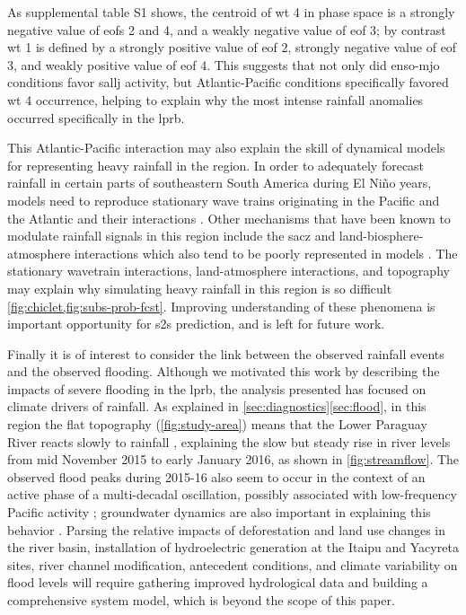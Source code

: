 \documentclass{ametsoc}
\begin{document}
As supplemental table S1 shows, the centroid of \gls{wt} 4 in phase space is a strongly negative value of \glspl{eof} 2 and 4, and a weakly negative value of \gls{eof} 3; by contrast \gls{wt} 1 is defined by a strongly positive value of \gls{eof} 2, strongly negative value of \gls{eof} 3, and weakly positive value of \gls{eof} 4.
This suggests that not only did \gls{enso}-\gls{mjo} conditions favor \gls{sallj} activity, but Atlantic-Pacific conditions specifically favored  \gls{wt} 4 occurrence, helping to explain why the most intense rainfall anomalies occurred specifically in the \gls{lprb}.

This Atlantic-Pacific interaction may also explain the skill of dynamical models for representing heavy rainfall in the region.
In order to adequately forecast rainfall in certain parts of southeastern South America during El Ni\~no years, models need to reproduce stationary wave trains originating in the Pacific and the Atlantic and their interactions \citep{Barreiro2017}.
Other mechanisms that have been known to modulate rainfall signals in this region include the \gls{sacz} \citep{Carvalho2004,Munoz2015,Munoz2016} and land-biosphere-atmosphere interactions \citep{Grimm2000,Grimm2007} which also tend to be poorly represented in models \citep{Koster2004,Green2017}.
The stationary wavetrain interactions, land-atmosphere interactions, and topography may explain why simulating heavy rainfall in this region is so difficult  \cref{fig:chiclet,fig:subs-prob-fcst}.
Improving understanding of these phenomena is important opportunity for \gls{s2s} prediction, and is left for future work.

Finally it is of interest to consider the link between the observed rainfall events and the observed flooding.
Although we motivated this work by describing the impacts of severe flooding in the \gls{lprb}, the analysis presented has focused on climate drivers of rainfall.
As explained in \cref{sec:diagnostics}\ref{sec:flood}, in this region the flat topography (\cref{fig:study-area}) means that the Lower Paraguay River reacts slowly to rainfall \citep{Bravo2011,Barros2004}, explaining the slow but steady rise in river levels from mid November 2015 to early January 2016, as shown in \cref{fig:streamflow}.
The observed flood peaks during 2015-16 also seem to occur in the context of an active phase of a multi-decadal oscillation, possibly associated with low-frequency Pacific activity \citep{Collischonn2001,Huang2005}; groundwater dynamics are also important in explaining this behavior \citep{Santos2016}.
Parsing the relative impacts of deforestation and land use changes in the river basin, installation of hydroelectric generation at the Itaipu and Yacyreta sites, river channel modification, antecedent conditions, and climate variability on flood levels will require gathering improved hydrological data and building a comprehensive system model, which is beyond the scope of this paper.
\end{document}
